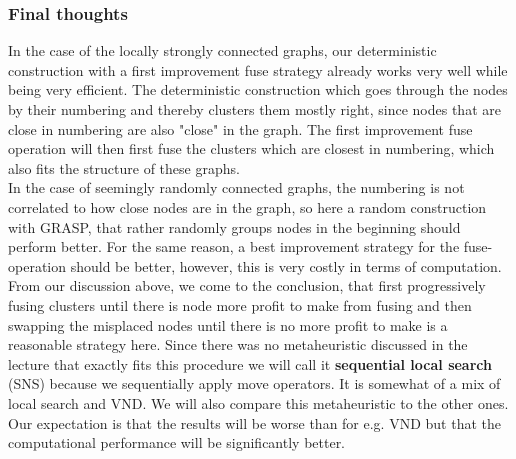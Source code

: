 \subsubsection{Final thoughts}
In the case of the locally strongly connected graphs, our deterministic construction with a first improvement 
fuse strategy already works very well while being very efficient. The deterministic construction which goes 
through the nodes by their numbering and thereby clusters them mostly right, since nodes that are close in numbering 
are also "close" in the graph. The first improvement fuse operation will then first fuse the clusters which 
are closest in numbering, which also fits the structure of these graphs.\\
In the case of seemingly randomly connected graphs, the numbering is not correlated to how close nodes are in the 
graph, so here a random construction with GRASP, that rather randomly groups nodes in the beginning should perform 
better. For the same reason, a best improvement strategy for the fuse-operation should be better, however, this is 
very costly in terms of computation.\\
From our discussion above, we come to the conclusion, that first progressively fusing clusters until there is node 
more profit to make from fusing and then swapping the misplaced nodes until there is no more profit to make is a 
reasonable strategy here. Since there was no metaheuristic discussed in the lecture that exactly fits this procedure 
we will call it \textbf{sequential local search} (SNS) because we sequentially apply move operators. It is somewhat 
of a mix of local search and VND. We will also compare this metaheuristic to the other ones. Our expectation is that 
the results will be worse than for e.g. VND but that the computational performance will be significantly better.\\